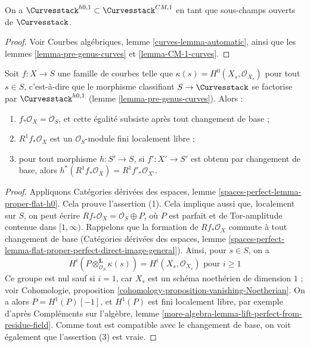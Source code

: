\begin{lemma}
\label{lemma-pre-genus-in-CM-1}
On a $\Curvesstack^{h0, 1} \subset \Curvesstack^{CM, 1}$
en tant que sous-champs ouverts de $\Curvesstack$.
\end{lemma}

\begin{proof}
Voir Courbes algébriques, lemme \ref{curves-lemma-automatic}, ainsi que les
lemmes \ref{lemma-pre-genus-curves} et \ref{lemma-CM-1-curves}.
\end{proof}

\begin{lemma}
\label{lemma-genus}
Soit $f : X \to S$ une famille de courbes telle que
$\kappa(s) = H^0(X_s, \mathcal{O}_{X_s})$ pour tout $s \in S$, c'est-à-dire que
le morphisme classifiant $S \to \Curvesstack$ se factorise par
$\Curvesstack^{h0, 1}$ (lemme \ref{lemma-pre-genus-curves}). Alors :
\begin{enumerate}
\item $f_*\mathcal{O}_X = \mathcal{O}_S$, et cette égalité subsiste après tout changement de base ;
\item $R^1f_*\mathcal{O}_X$ est un $\mathcal{O}_S$-module fini localement libre ;
\item pour tout morphisme $h : S' \to S$, si $f' : X' \to S'$ est obtenu par
changement de base, alors $h^*(R^1f_*\mathcal{O}_X) = R^1f'_*\mathcal{O}_{X'}$.
\end{enumerate}
\end{lemma}

\begin{proof}
Appliquons Catégories dérivées des espaces, lemme
\ref{spaces-perfect-lemma-proper-flat-h0}.
Cela prouve l'assertion (1). Cela implique aussi que, localement sur $S$,
on peut écrire $Rf_*\mathcal{O}_X = \mathcal{O}_S \oplus P$,
où $P$ est parfait et de Tor-amplitude contenue dans $[1, \infty)$.
Rappelons que la formation de $Rf_*\mathcal{O}_X$ commute
à tout changement de base
(Catégories dérivées des espaces, lemme
\ref{spaces-perfect-lemma-flat-proper-perfect-direct-image-general}).
Ainsi, pour $s \in S$, on a
$$
H^i(P \otimes_{\mathcal{O}_S}^\mathbf{L} \kappa(s)) =
H^i(X_s, \mathcal{O}_{X_s})
\text{ pour }i \geq 1
$$
Ce groupe est nul sauf si $i = 1$, car $X_s$ est un schéma noethérien
de dimension $1$ ; voir
Cohomologie, proposition \ref{cohomology-proposition-vanishing-Noetherian}.
On a alors $P = H^1(P)[-1]$, et $H^1(P)$ est fini localement libre,
par exemple d'après Compléments sur l'algèbre, lemme
\ref{more-algebra-lemma-lift-perfect-from-residue-field}.
Comme tout est compatible avec le changement de base, on voit
également que l'assertion (3) est vraie.
\end{proof}

